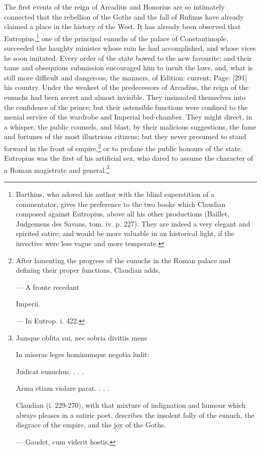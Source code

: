The first events of the reign of Arcadius and Honorius are so intimately connected that the rebellion of the Goths and the fall of Rufinus have already claimed a place in the history of the West. It has already been observed that Eutropius,\footnote{Barthius, who adored his author with the blind superstition of a commentator, gives the preference to the two books which Claudian composed against Eutropius, above all his other productions (Baillet, Judgemens des Savans, tom. iv. p. 227). They are indeed a very elegant and spirited satire; and would be more valuable in an historical light, if the invective were less vague and more temperate.} one of the principal eunuchs of the palace of Constantinople, succeeded the haughty minister whose ruin he had accomplished, and whose vices he soon imitated. Every order of the state bowed to the new favourite; and their tame and obsequious submission encouraged him to insult the laws, and, what is still more difficult and dangerous, the manners, of Edition: current; Page: [291] his country. Under the weakest of the predecessors of Arcadius, the reign of the eunuchs had been secret and almost invisible. They insinuated themselves into the confidence of the prince; but their ostensible functions were confined to the menial service of the wardrobe and Imperial bed-chamber. They might direct, in a whisper, the public counsels, and blast, by their malicious suggestions, the fame and fortunes of the most illustrious citizens; but they never presumed to stand forward in the front of empire,\footnote{After lamenting the progress of the eunuchs in the Roman palace and defining their proper functions, Claudian adds,

\texthebrew{—} A fronte recedant

Imperii.

\texthebrew{—} In Eutrop. i. 422.} or to profane the public honours of the state. Eutropius was the first of his artificial sex, who dared to assume the character of a Roman magistrate and general.\footnote{Jamque oblita sui, nec sobria divitiis mens

In miseras leges hominumque negotia ludit:

Judicat eunuchus. . . .

Arma etiam violare parat. . . .

Claudian (i. 229-270), with that mixture of indignation and humour which always pleases in a satiric poet, describes the insolent folly of the eunuch, the disgrace of the empire, and the joy of the Goths.

\texthebrew{—} Gaudet, cum viderit hostis,

}
